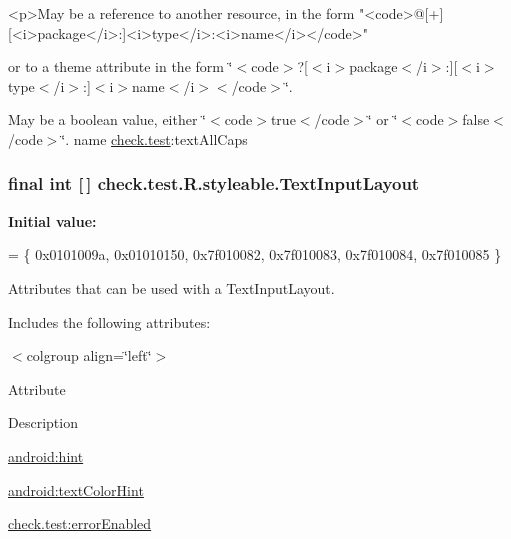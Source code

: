 \begin{DoxyVerb}      <p>May be a reference to another resource, in the form "<code>@[+][<i>package</i>:]<i>type</i>:<i>name</i></code>"
\end{DoxyVerb}
 or to a theme attribute in the form \char`\"{}$<$code$>$?\mbox{[}$<$i$>$package$<$/i$>$\+:\mbox{]}\mbox{[}$<$i$>$type$<$/i$>$\+:\mbox{]}$<$i$>$name$<$/i$>$$<$/code$>$\char`\"{}. 

May be a boolean value, either \char`\"{}$<$code$>$true$<$/code$>$\char`\"{} or \char`\"{}$<$code$>$false$<$/code$>$\char`\"{}.  name \hyperlink{namespacecheck_1_1test}{check.\+test}\+:text\+All\+Caps \hypertarget{classcheck_1_1test_1_1_r_1_1styleable_a56e445e43589d92521fa1b8fd6e2e470}{}
\subsubsection[{Text\+Input\+Layout}]{\setlength{\rightskip}{0pt plus 5cm}final int \mbox{[}$\,$\mbox{]} check.\+test.\+R.\+styleable.\+Text\+Input\+Layout\hspace{0.3cm}{\ttfamily [static]}}\label{classcheck_1_1test_1_1_r_1_1styleable_a56e445e43589d92521fa1b8fd6e2e470}
{\bfseries Initial value\+:}
\begin{DoxyCode}
= \{
            0x0101009a, 0x01010150, 0x7f010082, 0x7f010083,
            0x7f010084, 0x7f010085
        \}
\end{DoxyCode}
Attributes that can be used with a Text\+Input\+Layout. 

Includes the following attributes\+:

\begin{TabularC}{0}
\hline
\end{TabularC}
$<$colgroup align=\char`\"{}left\char`\"{}$>$ 

Attribute

Description 

{\ttfamily \hyperlink{classcheck_1_1test_1_1_r_1_1styleable_ad6a5cba28470d2e39b5a58db528e9851}{android\+:hint}}

{\ttfamily \hyperlink{classcheck_1_1test_1_1_r_1_1styleable_acec272e290ec4a23a75d437f8712b96a}{android\+:text\+Color\+Hint}}

{\ttfamily \hyperlink{classcheck_1_1test_1_1_r_1_1styleable_a61fd0cbc829c3fa93cc7a808bc58231e}{check.\+test\+:error\+Enabled}}

